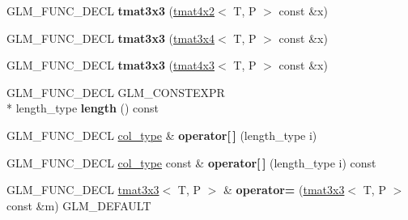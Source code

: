 \begin{DoxyCompactItemize}
\item 
\hypertarget{structglm_1_1tmat3x3_a8eaaa7ef745a4df937cd8dc5f12213f2}{G\-L\-M\-\_\-\-F\-U\-N\-C\-\_\-\-D\-E\-C\-L {\bfseries tmat3x3} (\hyperlink{structglm_1_1tmat4x2}{tmat4x2}$<$ T, P $>$ const \&x)}\label{structglm_1_1tmat3x3_a8eaaa7ef745a4df937cd8dc5f12213f2}

\item 
\hypertarget{structglm_1_1tmat3x3_a8f269bd1b6c26bfd0d4b927a3b0f6912}{G\-L\-M\-\_\-\-F\-U\-N\-C\-\_\-\-D\-E\-C\-L {\bfseries tmat3x3} (\hyperlink{structglm_1_1tmat3x4}{tmat3x4}$<$ T, P $>$ const \&x)}\label{structglm_1_1tmat3x3_a8f269bd1b6c26bfd0d4b927a3b0f6912}

\item 
\hypertarget{structglm_1_1tmat3x3_ab5db8d851443b1b0ab376ffd3ac44f77}{G\-L\-M\-\_\-\-F\-U\-N\-C\-\_\-\-D\-E\-C\-L {\bfseries tmat3x3} (\hyperlink{structglm_1_1tmat4x3}{tmat4x3}$<$ T, P $>$ const \&x)}\label{structglm_1_1tmat3x3_ab5db8d851443b1b0ab376ffd3ac44f77}

\item 
\hypertarget{structglm_1_1tmat3x3_a9167c5694c776b34148ff12dc1e49255}{G\-L\-M\-\_\-\-F\-U\-N\-C\-\_\-\-D\-E\-C\-L G\-L\-M\-\_\-\-C\-O\-N\-S\-T\-E\-X\-P\-R \\*
length\-\_\-type {\bfseries length} () const }\label{structglm_1_1tmat3x3_a9167c5694c776b34148ff12dc1e49255}

\item 
\hypertarget{structglm_1_1tmat3x3_a168abb413d19f4ff78005b4a4015c9e1}{G\-L\-M\-\_\-\-F\-U\-N\-C\-\_\-\-D\-E\-C\-L \hyperlink{structglm_1_1tvec3}{col\-\_\-type} \& {\bfseries operator\mbox{[}$\,$\mbox{]}} (length\-\_\-type i)}\label{structglm_1_1tmat3x3_a168abb413d19f4ff78005b4a4015c9e1}

\item 
\hypertarget{structglm_1_1tmat3x3_a7098a8e6c89fb4bce4a95e15b477a93e}{G\-L\-M\-\_\-\-F\-U\-N\-C\-\_\-\-D\-E\-C\-L \hyperlink{structglm_1_1tvec3}{col\-\_\-type} const \& {\bfseries operator\mbox{[}$\,$\mbox{]}} (length\-\_\-type i) const }\label{structglm_1_1tmat3x3_a7098a8e6c89fb4bce4a95e15b477a93e}

\item 
\hypertarget{structglm_1_1tmat3x3_a8e3b06bdaf66de32dcd841834cf8c944}{G\-L\-M\-\_\-\-F\-U\-N\-C\-\_\-\-D\-E\-C\-L \hyperlink{structglm_1_1tmat3x3}{tmat3x3}$<$ T, P $>$ \& {\bfseries operator=} (\hyperlink{structglm_1_1tmat3x3}{tmat3x3}$<$ T, P $>$ const \&m) G\-L\-M\-\_\-\-D\-E\-F\-A\-U\-L\-T}\label{structglm_1_1tmat3x3_a8e3b06bdaf66de32dcd841834cf8c944}


\end{DoxyCompactItemize}
